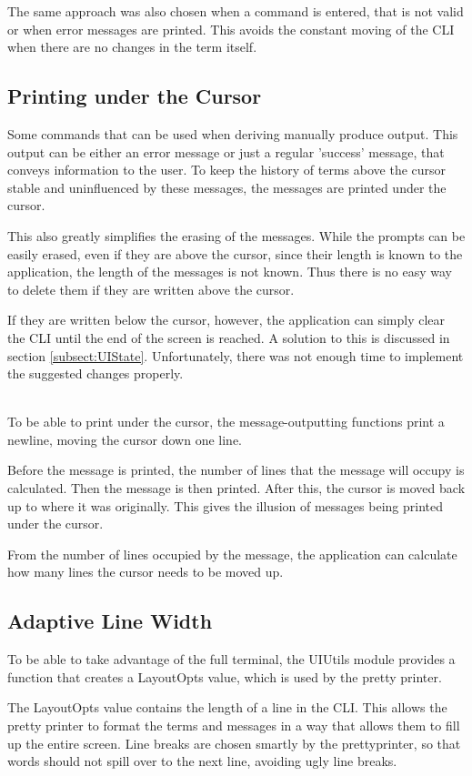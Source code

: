 The same approach was also chosen when a command is entered,
that is not valid or when error messages are printed.
This avoids the constant moving of the CLI when there are no changes in the term itself.

\subsection{Printing under the Cursor}
Some commands that can be used when deriving manually produce output.
This output can be either an error message or just a regular 'success' message,
that conveys information to the user.
To keep the history of terms above the cursor stable and uninfluenced by these messages,
the messages are printed under the cursor.

This also greatly simplifies the erasing of the messages.
While the prompts can be easily erased, even if they are above the cursor, since their length is known to the application,
the length of the messages is not known.
Thus there is no easy way to delete them if they are written above the cursor.

If they are written below the cursor, however,
the application can simply clear the CLI until the end of the screen is reached.
A solution to this is discussed in section \ref*{subsect:UIState}.
Unfortunately, there was not enough time to implement the suggested changes properly.

\ \\
To be able to print under the cursor,
the message-outputting functions print a newline,
moving the cursor down one line.

Before the message is printed,
the number of lines that the message will occupy is calculated.
Then the message is then printed.
After this,
the cursor is moved back up to where it was originally.
This gives the illusion of messages being printed under the cursor.

From the number of lines occupied by the message,
the application can calculate how many lines the cursor needs to be moved up.

\subsection{Adaptive Line Width}
To be able to take advantage of the full terminal,
the UIUtils module provides a function that creates a LayoutOpts value,
which is used by the pretty printer.

The LayoutOpts value contains the length of a line in the CLI.
This allows the pretty printer to format the terms and messages in a way that
allows them to fill up the entire screen.
Line breaks are chosen smartly by the prettyprinter,
so that words should not spill over to the next line,
avoiding ugly line breaks.

